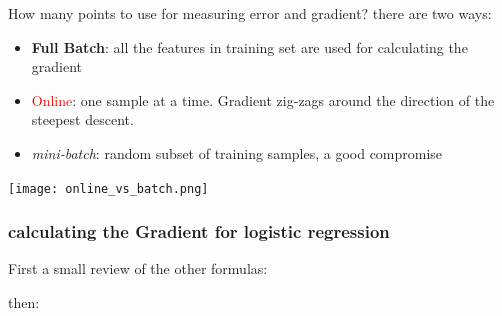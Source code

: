How many points to use for measuring error and gradient? there are two ways:
\begin{itemize}
    \item \textbf{Full Batch}: all the features in training set are used for calculating the gradient
    \item \textcolor{red}{Online}: one sample at a time. Gradient zig-zags around the direction of the steepest descent.
    \item \textit{mini-batch}: random subset of training samples, a good compromise 
\end{itemize}

\begin{center}
    \texttt{[image: online\_vs\_batch.png]}
\end{center}

\subsubsection{calculating the Gradient for logistic regression}
First a small review of the other formulas:

then:

